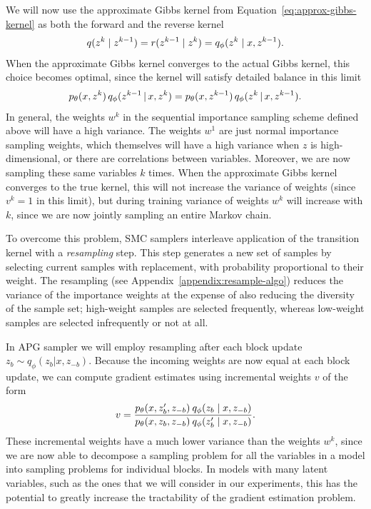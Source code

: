 \documentclass{article}
\theoremstyle{definition}
\begin{document}
We will now use the approximate Gibbs kernel from Equation~\ref{eq:approx-gibbs-kernel} as both the forward and the reverse kernel
\begin{align}
    q(z^{k} \mid  z^{k-1}) = r(z^{k-1} \mid  z^k) = q_\phi(z^k \mid x, z^{k-1}).
\end{align}
When the approximate Gibbs kernel converges to the actual Gibbs kernel, this choice becomes optimal, since the kernel will satisfy detailed balance in this limit
\begin{align*}
    p_\theta(x, z^k) 
    \,
    q_\phi(z^{k-1} \,|\, x, z^{k})
    =
    p_\theta(x, z^{k-1}) 
    \,
    q_\phi(z^{k} \,|\, x, z^{k-1}).
\end{align*}
In general, the weights $w^k$ in the sequential importance sampling scheme defined above will have a high variance. The weights $w^1$ are just normal importance sampling weights, which themselves will have a high variance when $z$ is high-dimensional, or there are correlations between variables. Moreover, we are now sampling these same variables $k$ times. When the approximate Gibbs kernel converges to the true kernel, this will not increase the variance of weights (since $v^k=1$ in this limit), but during training variance of weights $w^k$ will increase with $k$, since we are now jointly sampling an entire Markov chain.

To overcome this problem, SMC samplers interleave application of the transition kernel with a \emph{resampling} step. This step generates a new set of samples by selecting current samples with replacement, with probability proportional to their weight.
The resampling (see Appendix~\ref{appendix:resample-algo}) reduces the variance of the importance weights at the expense of also reducing the diversity of the sample set; high-weight samples are selected frequently, whereas low-weight samples are selected infrequently or not at all.

In APG sampler we will employ resampling after each block update $z_b\sim q_\phi(z_b | x, z_{-b})$. Because the incoming weights are now equal at each block update, we can compute gradient estimates using incremental weights $v$ of the form
\begin{align}
    v
    = 
    \frac{p_\theta(x, z'_b, z_{-b}) \: q_\phi(z_b \mid  x, z_{-b})}
         {p_\theta(x, z_b, z_{-b}) \: q_\phi(z'_b \mid  x, z_{-b})}
    .
\end{align}
These incremental weights have a much lower variance than the weights $w^k$, since we are now able to decompose a sampling problem for all the variables in a model into sampling problems for individual blocks. In models with many latent variables, such as the ones that we will consider in our experiments, this has the potential to greatly increase the tractability of the gradient estimation problem. 
\end{document}
